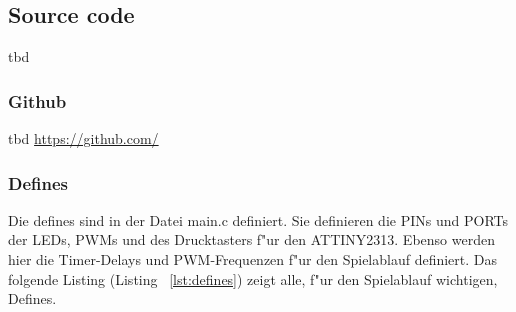 \subsection{Source code}
tbd %
\subsubsection{Github}

tbd %
\href{https://github.com/}{https://github.com/}
\vspace{0.5cm}

\subsubsection{Defines}

Die defines sind in der Datei main.c definiert. Sie definieren die PINs und PORTs der LEDs, PWMs und des Drucktasters f"ur den ATTINY2313.
Ebenso werden hier die Timer-Delays und PWM-Frequenzen f"ur den Spielablauf definiert. Das folgende Listing (Listing ~\ref{lst:defines}) zeigt alle, f"ur den Spielablauf wichtigen, Defines. 

